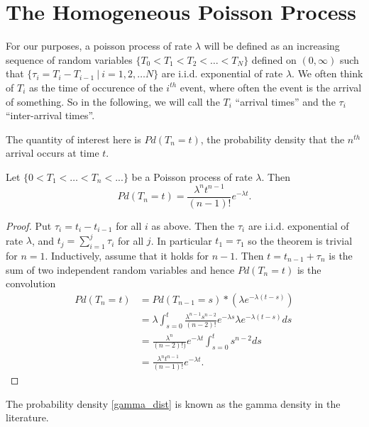 \documentclass[12pt,leqno]{article}
\begin{document}
\section{The Homogeneous Poisson Process}
For our purposes, a poisson process of rate $\lambda$ will be defined as an increasing sequence of random variables
$ \{T_0 < T_1 < T_2 < \dots < T_N\}$ defined on $(0,\infty)$ such that $\{\tau_i = T_i-T_{i-1}~|~ i = 1,2,\dots N\}$ are i.i.d.
exponential of rate $\lambda$. We often think of $T_i$ as the time of occurence of the $i^{th}$
event, where often the event is the arrival of something.  So in the following, we will call the $T_i$
``arrival times'' and the $\tau_i$ ``inter-arrival times''.  

The quantity of interest here is $Pd(T_n = t)$, the probability density that the $n^{th}$ arrival occurs at time $t$.
\begin{Thm}
  Let $\{0 < T_1<\dots<T_n<... \}$ be a Poisson process of rate $\lambda$.  Then
  \begin{equation}\label{gamma_dist}
  Pd(T_n = t) = \frac{\lambda^nt^{n-1}}{(n-1)!}e^{-\lambda{t}}.
  \end{equation}
  \begin{proof}
    Put $\tau_i = t_i - t_{i-1}$ for all $i$ as above. Then the $\tau_i$ are i.i.d. exponential of rate $\lambda$, and
    $t_j = \sum_{i=1}^j \tau_i$ for all $j$.  In particular $t_1 = \tau_1$ so the theorem is trivial for $n = 1$.
    Inductively, assume that it holds for $n-1$. Then $t = t_{n-1} + \tau_n$ is the sum of two independent random
    variables and hence $Pd(T_n = t)$ is the convolution
    \begin{align*}
      Pd(T_n = t) &= Pd(T_{n-1} = s)*({\lambda}e^{-\lambda(t-s)})\\
      &= \lambda\int_{s=0}^t\frac{\lambda^{n-1}s^{n-2}}{(n-2)!}e^{-\lambda{s}}{\lambda}e^{-\lambda(t-s)}ds \\
      &= \frac{\lambda^n}{(n-2)!)}e^{-\lambda{t}}\int_{s=0}^ts^{n-2}ds \\
      &= \frac{\lambda^nt^{n-1}}{(n-1)!}e^{-\lambda{t}}.
    \end{align*}
  \end{proof}
\end{Thm}
The probability density \eqref{gamma_dist} is known as the gamma density in the literature.
\end{document}
